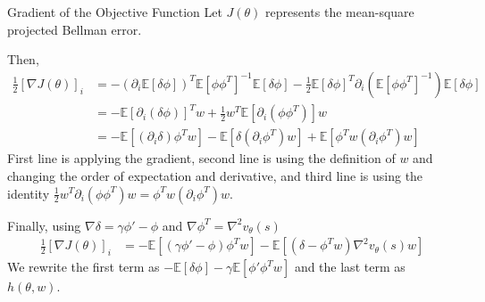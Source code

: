 \documentclass[11pt]{beamer}
\begin{document}
\begin{frame}{Gradient of the Objective Function}
	Let $J(\theta)$ represents the mean-square projected Bellman error.
	
	Then,
	\begin{align*}
		\frac{1}{2} [\nabla{}J(\theta)]_i & = -(\partial_i \mathbb{E}[\delta\phi])^T\mathbb{E}[\phi\phi^T]^{-1}\mathbb{E}[\delta\phi] - \frac{1}{2}\mathbb{E}[\delta\phi]^T\partial_i(\mathbb{E}[\phi\phi^T]^{-1})\mathbb{E}[\delta\phi] \\
		& = -\mathbb{E}[\partial_i(\delta\phi)]^Tw + \frac{1}{2}w^T\mathbb{E}[\partial_i(\phi\phi^T)]w \\
		& = -\mathbb{E}[(\partial_i\delta)\phi^Tw] - \mathbb{E}[\delta(\partial_i\phi^T)w] + \mathbb{E}[\phi^Tw(\partial_i\phi^T)w]
	\end{align*}
	{\footnotesize First line is applying the gradient, second line is using the definition of $w$ and changing the order of expectation and derivative, and third line is using the identity $\frac{1}{2}w^T\partial_i(\phi\phi^T)w = \phi^Tw(\partial_i\phi^T)w$}.
	
	Finally, using $\nabla\delta = \gamma\phi' - \phi$ and $\nabla\phi^T = \nabla^2v_\theta(s)$
	\begin{align*}
		\frac{1}{2} [\nabla{}J(\theta)]_i & = -\mathbb{E}[(\gamma\phi' - \phi)\phi^Tw] - \mathbb{E}[(\delta - \phi^Tw)\nabla^2v_\theta(s)w]
	\end{align*}
	{\footnotesize We rewrite the first term as $-\mathbb{E}[\delta\phi] - \gamma\mathbb{E}[\phi'\phi^Tw]$ and the last term as $h(\theta, w)$.}
\end{frame}
\end{document}
